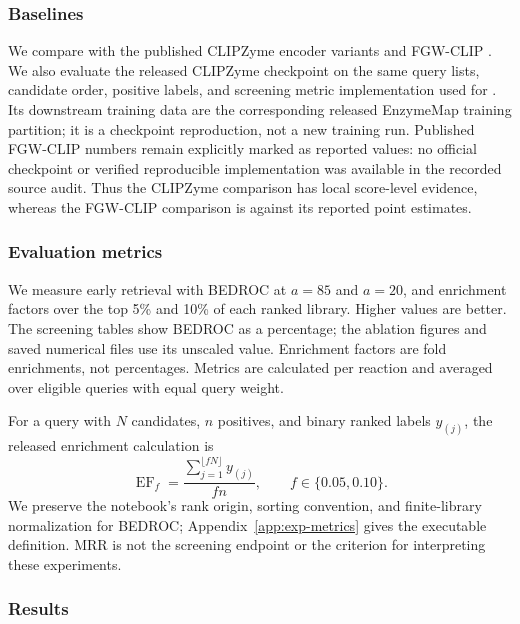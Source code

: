 \subsubsection{Baselines}

We compare with the published CLIPZyme encoder variants and FGW-CLIP
\citep{mikhael2024clipzyme,zhou2026fgwclip}. We also evaluate the released
CLIPZyme checkpoint on the same query lists, candidate order, positive labels,
and screening metric implementation used for \methodname. Its downstream
training data are the corresponding released EnzymeMap training partition;
it is a checkpoint reproduction, not a new training run. Published FGW-CLIP
numbers remain explicitly marked as reported values: no official checkpoint
or verified reproducible implementation was available in the recorded source
audit. Thus the CLIPZyme comparison has local score-level evidence, whereas
the FGW-CLIP comparison is against its reported point estimates.

\subsubsection{Evaluation metrics}

We measure early retrieval with BEDROC at $a=85$ and $a=20$, and enrichment
factors over the top 5\% and 10\% of each ranked library. Higher values are
better. The screening tables show BEDROC as a percentage; the ablation
figures and saved numerical files use its unscaled value. Enrichment factors
are fold enrichments, not percentages. Metrics are calculated per reaction
and averaged over eligible queries with equal query weight.

For a query with $N$ candidates, $n$ positives, and binary ranked labels
$y_{(j)}$, the released enrichment calculation is
\begin{equation}
  \operatorname{EF}_{f}
  =\frac{\sum_{j=1}^{\lfloor fN\rfloor}y_{(j)}}{f n},
  \qquad f\in\{0.05,0.10\}.
  \label{eq:exp-ef}
\end{equation}
We preserve the notebook's rank origin, sorting convention, and finite-library
normalization for BEDROC; Appendix~\ref{app:exp-metrics} gives the executable
definition. MRR is not the screening endpoint or the criterion for interpreting
these experiments.

\subsubsection{Results}

